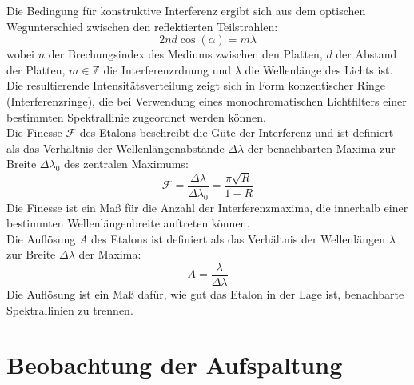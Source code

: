 \noindent Die Bedingung für konstruktive Interferenz ergibt sich aus dem optischen Wegunterschied zwischen den reflektierten Teilstrahlen:
\begin{equation}
    2nd \cos(\alpha) = m \lambda \label{equ:fabry_perot}
\end{equation}
wobei $n$ der Brechungsindex des Mediums zwischen den Platten, $d$ der Abstand der Platten, $m \in \mathbb{Z}$ die Interferenzrdnung und $\lambda$ die Wellenlänge des Lichts ist.\\
Die resultierende Intensitätsverteilung zeigt sich in Form konzentischer Ringe (Interferenzringe), die bei Verwendung eines monochromatischen Lichtfilters einer bestimmten Spektrallinie zugeordnet werden können.\\
Die Finesse $\mathcal{F}$ des Etalons beschreibt die Güte der Interferenz und ist definiert als das Verhältnis der Wellenlängenabstände $\Delta \lambda$ der benachbarten Maxima zur Breite $\Delta \lambda_0$ des zentralen Maximums:
\begin{equation}
    \mathcal{F} = \frac{\Delta \lambda}{\Delta \lambda_0} = \frac{\pi\sqrt{R}}{1-R}
\end{equation}
Die Finesse  ist ein Maß für die Anzahl der Interferenzmaxima, die innerhalb einer bestimmten Wellenlängenbreite auftreten können.\\
Die Auflösung $A$ des Etalons ist definiert als das Verhältnis der Wellenlängen $\lambda$ zur Breite $\Delta \lambda$ der Maxima:
\begin{equation}
    A = \frac{\lambda}{\Delta \lambda}
\end{equation}
Die Auflösung ist ein Maß dafür, wie gut das Etalon in der Lage ist, benachbarte Spektrallinien zu trennen.\\
%
%
\section{Beobachtung der Aufspaltung}
%
%
